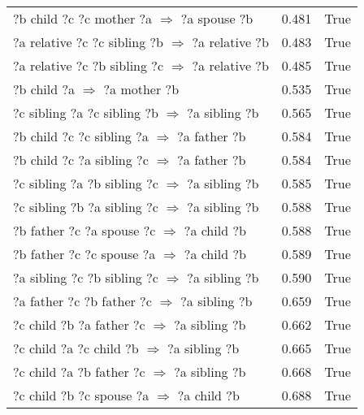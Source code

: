 \begin{longtable}{lrl}
       ?b  child  ?c  ?c  mother  ?a   $\Rightarrow$ ?a  spouse  ?b &           0.481 &                     True \\
 ?a  relative  ?c  ?c  sibling  ?b   $\Rightarrow$ ?a  relative  ?b &           0.483 &                     True \\
 ?a  relative  ?c  ?b  sibling  ?c   $\Rightarrow$ ?a  relative  ?b &           0.485 &                     True \\
                       ?b  child  ?a   $\Rightarrow$ ?a  mother  ?b &           0.535 &                     True \\
   ?c  sibling  ?a  ?c  sibling  ?b   $\Rightarrow$ ?a  sibling  ?b &           0.565 &                     True \\
      ?b  child  ?c  ?c  sibling  ?a   $\Rightarrow$ ?a  father  ?b &           0.584 &                     True \\
      ?b  child  ?c  ?a  sibling  ?c   $\Rightarrow$ ?a  father  ?b &           0.584 &                     True \\
   ?c  sibling  ?a  ?b  sibling  ?c   $\Rightarrow$ ?a  sibling  ?b &           0.585 &                     True \\
   ?c  sibling  ?b  ?a  sibling  ?c   $\Rightarrow$ ?a  sibling  ?b &           0.588 &                     True \\
       ?b  father  ?c  ?a  spouse  ?c   $\Rightarrow$ ?a  child  ?b &           0.588 &                     True \\
       ?b  father  ?c  ?c  spouse  ?a   $\Rightarrow$ ?a  child  ?b &           0.589 &                     True \\
   ?a  sibling  ?c  ?b  sibling  ?c   $\Rightarrow$ ?a  sibling  ?b &           0.590 &                     True \\
     ?a  father  ?c  ?b  father  ?c   $\Rightarrow$ ?a  sibling  ?b &           0.659 &                     True \\
      ?c  child  ?b  ?a  father  ?c   $\Rightarrow$ ?a  sibling  ?b &           0.662 &                     True \\
       ?c  child  ?a  ?c  child  ?b   $\Rightarrow$ ?a  sibling  ?b &           0.665 &                     True \\
      ?c  child  ?a  ?b  father  ?c   $\Rightarrow$ ?a  sibling  ?b &           0.668 &                     True \\
        ?c  child  ?b  ?c  spouse  ?a   $\Rightarrow$ ?a  child  ?b &           0.688 &                     True \\

\end{longtable}
